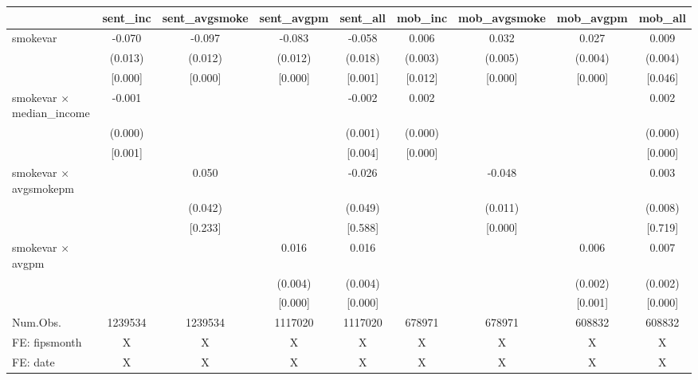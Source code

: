 \begin{table}
\centering
\begin{tabular}[t]{lcccccccc}
\toprule
  & sent\_inc & sent\_avgsmoke & sent\_avgpm & sent\_all & mob\_inc & mob\_avgsmoke & mob\_avgpm & mob\_all\\
\midrule
smokevar & -0.070 & -0.097 & -0.083 & -0.058 & 0.006 & 0.032 & 0.027 & 0.009\\
 & (0.013) & (0.012) & (0.012) & (0.018) & (0.003) & (0.005) & (0.004) & (0.004)\\
 & {}[0.000] & {}[0.000] & {}[0.000] & {}[0.001] & {}[0.012] & {}[0.000] & {}[0.000] & {}[0.046]\\
smokevar × median\_income & -0.001 &  &  & -0.002 & 0.002 &  &  & 0.002\\
 & (0.000) &  &  & (0.001) & (0.000) &  &  & (0.000)\\
 & {}[0.001] &  &  & {}[0.004] & {}[0.000] &  &  & {}[0.000]\\
smokevar × avgsmokepm &  & 0.050 &  & -0.026 &  & -0.048 &  & 0.003\\
 &  & (0.042) &  & (0.049) &  & (0.011) &  & (0.008)\\
 &  & {}[0.233] &  & {}[0.588] &  & {}[0.000] &  & {}[0.719]\\
smokevar × avgpm &  &  & 0.016 & 0.016 &  &  & 0.006 & 0.007\\
 &  &  & (0.004) & (0.004) &  &  & (0.002) & (0.002)\\
 &  &  & {}[0.000] & {}[0.000] &  &  & {}[0.001] & {}[0.000]\\
\midrule
Num.Obs. & 1239534 & 1239534 & 1117020 & 1117020 & 678971 & 678971 & 608832 & 608832\\
FE: fipsmonth & X & X & X & X & X & X & X & X\\
FE: date & X & X & X & X & X & X & X & X\\
\bottomrule
\end{tabular}
\end{table}
